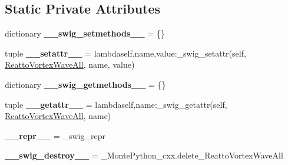 \subsection*{Static Private Attributes}
\begin{DoxyCompactItemize}
\item 
\hypertarget{classMontePython__cxx_1_1ReattoVortexWaveAll_a963b9b6d8e92a4fab2f52324ec657963}{}dictionary {\bfseries \+\_\+\+\_\+swig\+\_\+setmethods\+\_\+\+\_\+} = \{\}\label{classMontePython__cxx_1_1ReattoVortexWaveAll_a963b9b6d8e92a4fab2f52324ec657963}

\item 
\hypertarget{classMontePython__cxx_1_1ReattoVortexWaveAll_a0396d2d83aa5ae00be675ec82734d6fe}{}tuple {\bfseries \+\_\+\+\_\+setattr\+\_\+\+\_\+} = lambdaself,name,value\+:\+\_\+swig\+\_\+setattr(self, \hyperlink{classMontePython__cxx_1_1ReattoVortexWaveAll}{Reatto\+Vortex\+Wave\+All}, name, value)\label{classMontePython__cxx_1_1ReattoVortexWaveAll_a0396d2d83aa5ae00be675ec82734d6fe}

\item 
\hypertarget{classMontePython__cxx_1_1ReattoVortexWaveAll_af8b74e2ab7bb88186cf8be3c9a0fa671}{}dictionary {\bfseries \+\_\+\+\_\+swig\+\_\+getmethods\+\_\+\+\_\+} = \{\}\label{classMontePython__cxx_1_1ReattoVortexWaveAll_af8b74e2ab7bb88186cf8be3c9a0fa671}

\item 
\hypertarget{classMontePython__cxx_1_1ReattoVortexWaveAll_a69aba9d18d070b60862fe690f3cf11be}{}tuple {\bfseries \+\_\+\+\_\+getattr\+\_\+\+\_\+} = lambdaself,name\+:\+\_\+swig\+\_\+getattr(self, \hyperlink{classMontePython__cxx_1_1ReattoVortexWaveAll}{Reatto\+Vortex\+Wave\+All}, name)\label{classMontePython__cxx_1_1ReattoVortexWaveAll_a69aba9d18d070b60862fe690f3cf11be}

\item 
\hypertarget{classMontePython__cxx_1_1ReattoVortexWaveAll_a018f233c7ae0eeb3e962dda9c423e3c7}{}{\bfseries \+\_\+\+\_\+repr\+\_\+\+\_\+} = \+\_\+swig\+\_\+repr\label{classMontePython__cxx_1_1ReattoVortexWaveAll_a018f233c7ae0eeb3e962dda9c423e3c7}

\item 
\hypertarget{classMontePython__cxx_1_1ReattoVortexWaveAll_a847fe067cf6a03d29df4768a4285e0c4}{}{\bfseries \+\_\+\+\_\+swig\+\_\+destroy\+\_\+\+\_\+} = \+\_\+\+Monte\+Python\+\_\+cxx.\+delete\+\_\+\+Reatto\+Vortex\+Wave\+All\label{classMontePython__cxx_1_1ReattoVortexWaveAll_a847fe067cf6a03d29df4768a4285e0c4}

\end{DoxyCompactItemize}



